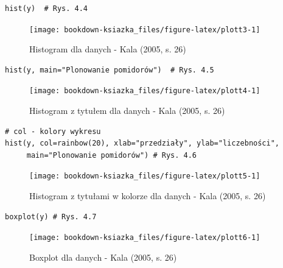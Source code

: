\documentclass[12pt,B5paper,]{book}
\begin{document}
\begin{verbatim}
hist(y)  # Rys. 4.4
\end{verbatim}

\begin{figure}[H]

{\centering \texttt{[image: bookdown-ksiazka\_files/figure-latex/plott3-1]} 

}

\caption{Histogram dla danych - Kala (2005, s. 26)}\label{fig:plott3}
\end{figure}

\begin{verbatim}
hist(y, main="Plonowanie pomidorów")  # Rys. 4.5
\end{verbatim}

\begin{figure}[H]

{\centering \texttt{[image: bookdown-ksiazka\_files/figure-latex/plott4-1]} 

}

\caption{Histogram z tytułem dla danych - Kala (2005, s. 26)}\label{fig:plott4}
\end{figure}

\begin{verbatim}
# col - kolory wykresu
hist(y, col=rainbow(20), xlab="przedziały", ylab="liczebności",
     main="Plonowanie pomidorów") # Rys. 4.6
\end{verbatim}

\begin{figure}[H]

{\centering \texttt{[image: bookdown-ksiazka\_files/figure-latex/plott5-1]} 

}

\caption{Histogram z tytułami w kolorze dla danych - Kala (2005, s. 26)}\label{fig:plott5}
\end{figure}

\begin{verbatim}
boxplot(y) # Rys. 4.7
\end{verbatim}

\begin{figure}[H]

{\centering \texttt{[image: bookdown-ksiazka\_files/figure-latex/plott6-1]} 

}

\caption{Boxplot dla danych - Kala (2005, s. 26)}\label{fig:plott6}
\end{figure}

\newpage
\end{document}
